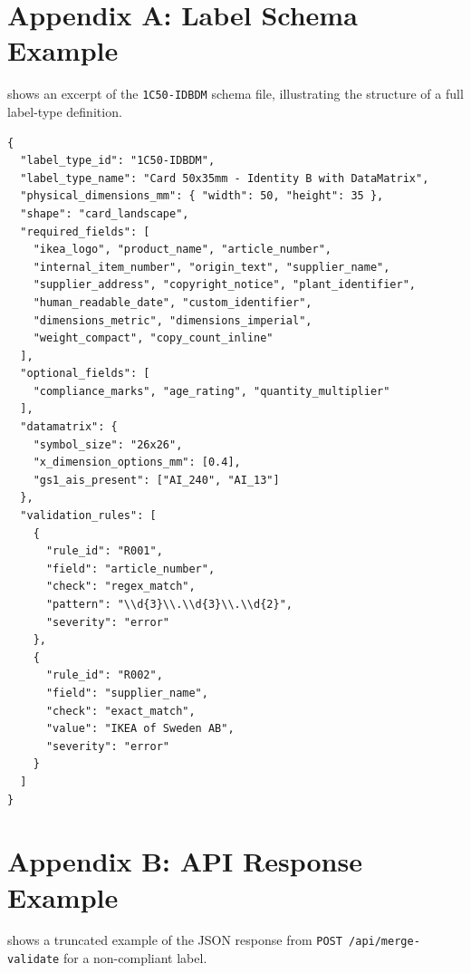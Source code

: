 \chapter{Appendix A: Label Schema Example}
\label{app:schema}

 shows an excerpt of the \texttt{1C50-IDBDM} schema file,
illustrating the structure of a full label-type definition.

\begin{lstlisting}[language={},
  caption={Excerpt from label-rules/1C50-IDBDM.json.},
  label={lst:schema_example}]
{
  "label_type_id": "1C50-IDBDM",
  "label_type_name": "Card 50x35mm - Identity B with DataMatrix",
  "physical_dimensions_mm": { "width": 50, "height": 35 },
  "shape": "card_landscape",
  "required_fields": [
    "ikea_logo", "product_name", "article_number",
    "internal_item_number", "origin_text", "supplier_name",
    "supplier_address", "copyright_notice", "plant_identifier",
    "human_readable_date", "custom_identifier",
    "dimensions_metric", "dimensions_imperial",
    "weight_compact", "copy_count_inline"
  ],
  "optional_fields": [
    "compliance_marks", "age_rating", "quantity_multiplier"
  ],
  "datamatrix": {
    "symbol_size": "26x26",
    "x_dimension_options_mm": [0.4],
    "gs1_ais_present": ["AI_240", "AI_13"]
  },
  "validation_rules": [
    {
      "rule_id": "R001",
      "field": "article_number",
      "check": "regex_match",
      "pattern": "\\d{3}\\.\\d{3}\\.\\d{2}",
      "severity": "error"
    },
    {
      "rule_id": "R002",
      "field": "supplier_name",
      "check": "exact_match",
      "value": "IKEA of Sweden AB",
      "severity": "error"
    }
  ]
}
\end{lstlisting}

\chapter{Appendix B: API Response Example}
\label{app:api}

 shows a truncated example of the JSON response from
\texttt{POST /api/merge-validate} for a non-compliant label.

